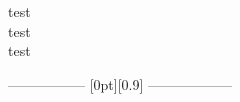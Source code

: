 \documentclass[17pt,a4paper]{extarticle}
\begin{document}
\noindent
test\\
test\\
test\\


\begin{center}
-----------------
\raisebox{-0.1ex}[0pt][0.9\baselineskip]{}
------------------
\end{center}
\end{document}
